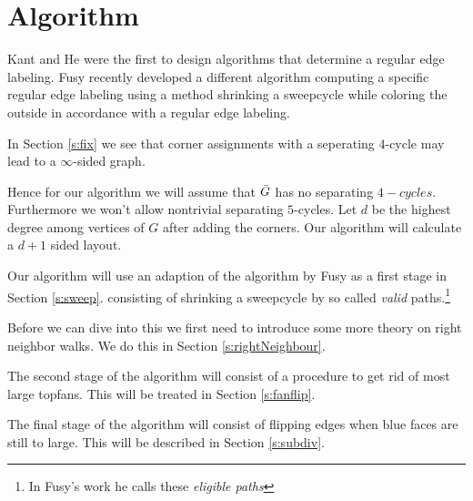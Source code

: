 
\section{Algorithm}

\label{s:algo}
Kant and He \cite{Kant1997} were the first to design algorithms that determine a regular edge labeling. Fusy \cite{Fusy2006} recently developed a different algorithm computing a specific regular edge labeling using a method shrinking a sweepcycle while coloring the outside in accordance with a regular edge labeling.

In Section \ref{s:fix} we see that corner assignments with a seperating $4$-cycle may lead to a $\infty$-sided graph.


Hence for our algorithm we will assume that $\bar{G}$ has no separating $4-cycles$. Furthermore we won't allow nontrivial separating $5$-cycles. Let $d$ be the highest degree among vertices of $G$ after adding the corners. Our algorithm will calculate a $d+1$ sided layout.



Our algorithm will use an adaption of the algorithm by Fusy as a first stage in Section \ref{s:sweep}.  consisting of shrinking a sweepcycle by so called \emph{valid} paths.\footnote{In Fusy's work he calls these \emph{eligible paths}}

Before we can dive into this we first need to introduce some more theory on right neighbor walks. We do this in Section \ref{s:rightNeighbour}.

The second stage of the algorithm will consist of a procedure to get rid of most large topfans. This will be treated in Section \ref{s:fanflip}.

The final stage of the algorithm will consist of flipping edges when blue faces are still to large. This will be described in Section \ref{s:subdiv}.
